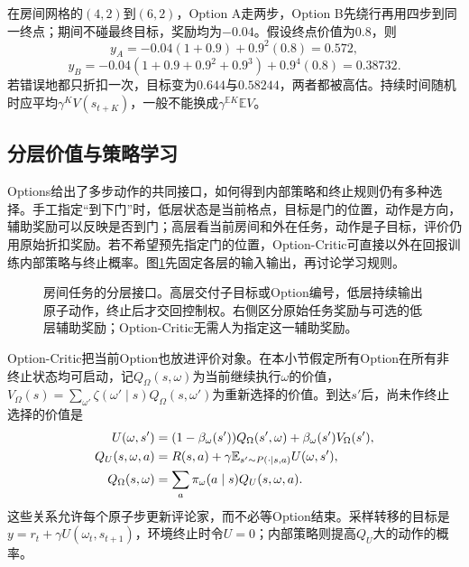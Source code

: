 \begin{example}[持续时间不能忽略]
  \label{ex:rl-learning-option-duration}
  在房间网格的$(4,2)$到$(6,2)$，Option A走两步，Option B先绕行再用四步到同一终点；期间不碰最终目标，奖励均为$-0.04$。假设终点价值为$0.8$，则
  \[
    y_A=-0.04(1+0.9)+0.9^2(0.8)=0.572,
  \]
  \[
    y_B=-0.04(1+0.9+0.9^2+0.9^3)+0.9^4(0.8)=0.38732.
  \]
  若错误地都只折扣一次，目标变为$0.644$与$0.58244$，两者都被高估。持续时间随机时应平均$\gamma^K V(s_{t+K})$，一般不能换成$\gamma^{\mathbb E K}\mathbb E V$。
\end{example}

\subsection{分层价值与策略学习}
\label{sec:rl-learning-hierarchical-learning}

Options给出了多步动作的共同接口，如何得到内部策略和终止规则仍有多种选择。手工指定“到下门”时，低层状态是当前格点，目标是门的位置，动作是方向，辅助奖励可以反映是否到门；高层看当前房间和外在任务，动作是子目标，评价仍用原始折扣奖励。若不希望预先指定门的位置，Option-Critic可直接以外在回报训练内部策略与终止概率。图\ref{fig:rl-learning-hierarchy}先固定各层的输入输出，再讨论学习规则。

\begin{figure}[t]
  \centering
  
  \caption{房间任务的分层接口。高层交付子目标或Option编号，低层持续输出原子动作，终止后才交回控制权。右侧区分原始任务奖励与可选的低层辅助奖励；Option-Critic无需人为指定这一辅助奖励。}
  \label{fig:rl-learning-hierarchy}
\end{figure}

Option-Critic把当前Option也放进评价对象。在本小节假定所有Option在所有非终止状态均可启动，记$Q_\Omega(s,\omega)$为当前继续执行$\omega$的价值，
$V_\Omega(s)=\sum_{\omega'}\zeta(\omega'\mid s)Q_\Omega(s,\omega')$为重新选择的价值。到达$s'$后，尚未作终止选择的价值是
\begin{align}
 U(\omega,s')
   &=(1-\beta_\omega(s'))Q_\Omega(s',\omega)
                               +\beta_\omega(s')V_\Omega(s'),\notag\\
 Q_U(s,\omega,a)
   &=R(s,a)+\gamma\mathbb E_{s'\sim P(\cdot\mid s,a)}U(\omega,s'),\notag\\
 Q_\Omega(s,\omega)&=\sum_a\pi_\omega(a\mid s)Q_U(s,\omega,a).
 \label{eq:rl-learning-option-critic}
\end{align}
这些关系允许每个原子步更新评论家，而不必等Option结束。采样转移的目标是
$y=r_t+\gamma U(\omega_t,s_{t+1})$，环境终止时令$U=0$；内部策略则提高$Q_U$大的动作的概率。

